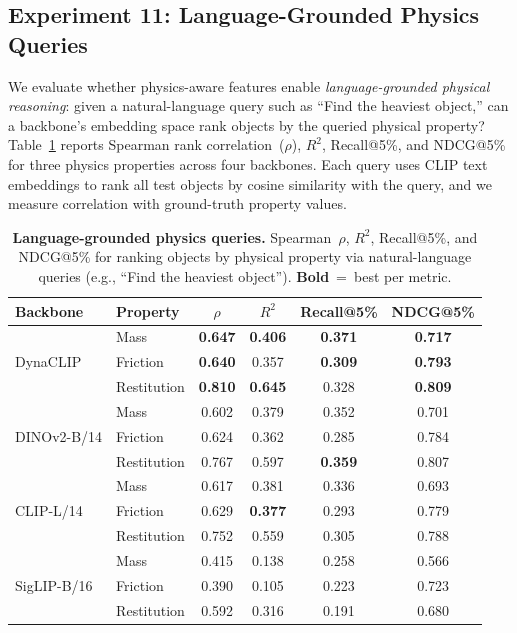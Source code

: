 \documentclass{article}
\newcommand{\methodname}{DynaCLIP}
\newcommand{\best}[1]{\textbf{#1}}
\begin{document}
\subsection{Experiment 11: Language-Grounded Physics Queries}
\label{sec:exp_queries}

We evaluate whether physics-aware features enable \emph{language-grounded physical reasoning}: given a natural-language query such as ``Find the heaviest object,'' can a backbone's embedding space rank objects by the queried physical property? Table~\ref{tab:queries} reports Spearman rank correlation~($\rho$), $R^2$, Recall@5\%, and NDCG@5\% for three physics properties across four backbones. Each query uses CLIP text embeddings to rank all test objects by cosine similarity with the query, and we measure correlation with ground-truth property values.

\begin{table}[t]
\centering
\caption{\textbf{Language-grounded physics queries.} Spearman~$\rho$, $R^2$, Recall@5\%, and NDCG@5\% for ranking objects by physical property via natural-language queries (e.g., ``Find the heaviest object''). \best{Bold}~=~best per metric.}
\label{tab:queries}
\small
\setlength{\tabcolsep}{4pt}
\begin{tabular}{@{}llcccc@{}}
\toprule
\textbf{Backbone} & \textbf{Property} & $\rho$ & $R^2$ & Recall@5\% & NDCG@5\% \\
\midrule
\multirow{3}{*}{\methodname{}} & Mass & \best{0.647} & \best{0.406} & \best{0.371} & \best{0.717} \\
& Friction & \best{0.640} & 0.357 & \best{0.309} & \best{0.793} \\
& Restitution & \best{0.810} & \best{0.645} & 0.328 & \best{0.809} \\
\midrule
\multirow{3}{*}{DINOv2-B/14} & Mass & 0.602 & 0.379 & 0.352 & 0.701 \\
& Friction & 0.624 & 0.362 & 0.285 & 0.784 \\
& Restitution & 0.767 & 0.597 & \best{0.359} & 0.807 \\
\midrule
\multirow{3}{*}{CLIP-L/14} & Mass & 0.617 & 0.381 & 0.336 & 0.693 \\
& Friction & 0.629 & \best{0.377} & 0.293 & 0.779 \\
& Restitution & 0.752 & 0.559 & 0.305 & 0.788 \\
\midrule
\multirow{3}{*}{SigLIP-B/16} & Mass & 0.415 & 0.138 & 0.258 & 0.566 \\
& Friction & 0.390 & 0.105 & 0.223 & 0.723 \\
& Restitution & 0.592 & 0.316 & 0.191 & 0.680 \\
\bottomrule
\end{tabular}
\vspace{-0.5em}
\end{table}
\end{document}
